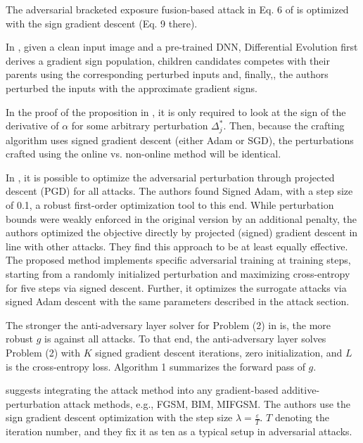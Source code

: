 \documentclass[11pt]{book}
\begin{document}
The adversarial bracketed exposure fusion-based attack in Eq. 6 of
\cite{cheng2020adversarial} is optimized with the sign gradient descent
(Eq. 9 there).

In \cite{lin2020black}, given a clean input image and a pre-trained
DNN, Differential Evolution first derives a gradient sign population,
children candidates competes with their parents using the corresponding
perturbed inputs and, finally,, the authors perturbed the inputs with
the approximate gradient signs.

In the proof of the proposition in \cite{fowl2021preventing}, it
is only required to look at the sign of the derivative of \textquotedbl$\alpha$\textquotedbl{}
for some arbitrary perturbation $\Delta_{j}^{\ast}$. Then, because
the crafting algorithm uses signed gradient descent (either Adam or
SGD), the perturbations crafted using the online vs. non-online method
will be identical.

In \cite{geiping2021doesn}, it is possible to optimize the adversarial
perturbation through projected descent (PGD) for all attacks. The
authors found Signed Adam, with a step size of 0.1, a robust first-order
optimization tool to this end. While perturbation bounds were weakly
enforced in the original version by an additional penalty, the authors
optimized the objective directly by projected (signed) gradient descent
in line with other attacks. They find this approach to be at least
equally effective. The proposed method implements specific adversarial
training at training steps, starting from a randomly initialized perturbation
and maximizing cross-entropy for five steps via signed descent. Further,
it optimizes the surrogate attacks via signed Adam descent with the
same parameters described in the attack section.

The stronger the anti-adversary layer solver for Problem (2) in \cite{alfarra2021combating}
is, the more robust $g$ is against all attacks. To that end, the
anti-adversary layer solves Problem (2) with $K$ signed gradient
descent iterations, zero initialization, and $L$ is the cross-entropy
loss. Algorithm 1 summarizes the forward pass of $g$.

\cite{gao2021adversarial} suggests integrating the attack method
into any gradient-based additive-perturbation attack methods, e.g.,
FGSM, BIM, MIFGSM. The authors use the sign gradient descent optimization
with the step size $\lambda=\frac{\varepsilon}{T}$. $T$ denoting
the iteration number, and they fix it as ten as a typical setup in
adversarial attacks.
\end{document}
